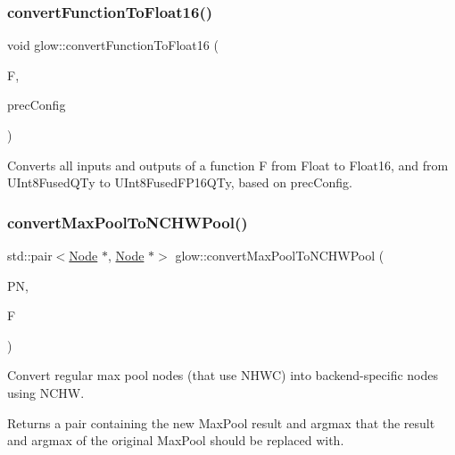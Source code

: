 \subsubsection{\texorpdfstring{convert\+Function\+To\+Float16()}{convertFunctionToFloat16()}}
{\footnotesize\ttfamily void glow\+::convert\+Function\+To\+Float16 (\begin{DoxyParamCaption}\item[{\hyperlink{classglow_1_1_function}{Function} $\ast$}]{F,  }\item[{const \hyperlink{structglow_1_1_precision_configuration}{Precision\+Configuration} \&}]{prec\+Config }\end{DoxyParamCaption})}

Converts all inputs and outputs of a function {\ttfamily F} from Float to Float16, and from U\+Int8\+Fused\+Q\+Ty to U\+Int8\+Fused\+F\+P16\+Q\+Ty, based on {\ttfamily prec\+Config}. \mbox{\label{namespaceglow_a67b90e6ec31547354c4e796d906cebd0}} 
\subsubsection{\texorpdfstring{convert\+Max\+Pool\+To\+N\+C\+H\+W\+Pool()}{convertMaxPoolToNCHWPool()}}
{\footnotesize\ttfamily std\+::pair$<$\hyperlink{classglow_1_1_node}{Node} $\ast$, \hyperlink{classglow_1_1_node}{Node} $\ast$$>$ glow\+::convert\+Max\+Pool\+To\+N\+C\+H\+W\+Pool (\begin{DoxyParamCaption}\item[{\hyperlink{classglow_1_1_max_pool_node}{Max\+Pool\+Node} $\ast$}]{PN,  }\item[{\hyperlink{classglow_1_1_function}{Function} $\ast$}]{F }\end{DoxyParamCaption})\hspace{0.3cm}{\ttfamily [inline]}}

Convert regular max pool nodes (that use N\+H\+WC) into backend-\/specific nodes using N\+C\+HW. \begin{DoxyReturn}{Returns}
a pair containing the new Max\+Pool result and argmax that the result and argmax of the original Max\+Pool should be replaced with. 
\end{DoxyReturn}
\mbox{\label{namespaceglow_a7c4fddd8b31e37460f88d44f076a2863}} 
